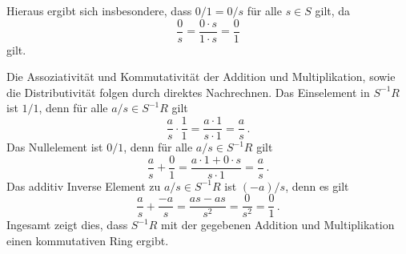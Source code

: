 Hieraus ergibt sich insbesondere, dass $0/1 = 0/s$ für alle $s \in S$ gilt, da
\[
    \frac{0}{s}
  = \frac{0 \cdot s}{1 \cdot s}
  = \frac{0}{1}
\]
gilt.

Die Assoziativität und Kommutativität der Addition und Multiplikation, sowie die Distributivität folgen durch direktes Nachrechnen.
Das Einselement in $S^{-1} R$ ist $1/1$, denn für alle $a/s \in S^{-1} R$ gilt
\[
    \frac{a}{s} \cdot \frac{1}{1}
  = \frac{a \cdot 1}{s \cdot 1}
  = \frac{a}{s} \,.
\]
Das Nullelement ist $0/1$, denn für alle $a/s \in S^{-1} R$ gilt
\[
    \frac{a}{s} + \frac{0}{1}
  = \frac{a \cdot 1 + 0 \cdot s}{s \cdot 1}
  = \frac{a}{s} \,.
\]
Das additiv Inverse Element zu $a/s \in S^{-1} R$ ist $(-a)/s$, denn es gilt
\[
    \frac{a}{s} + \frac{-a}{s}
  = \frac{a s - a s}{s^2}
  = \frac{0}{s^2}
  = \frac{0}{1} \,.
\]
Ingesamt zeigt dies, dass $S^{-1} R$ mit der gegebenen Addition und Multiplikation einen kommutativen Ring ergibt.




